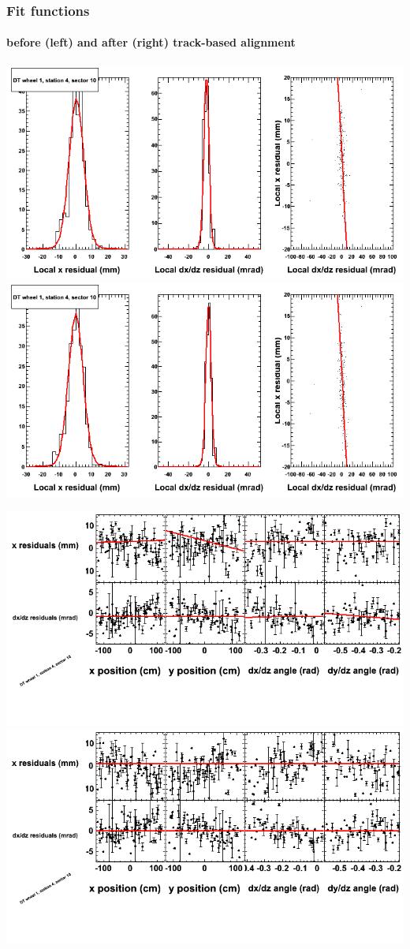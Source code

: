 \documentclass[compress]{beamer}
\begin{document}
\begin{frame}
\frametitle{Fit functions}
\framesubtitle{before (left) and after (right) track-based alignment}
\includegraphics[width=0.5\linewidth]{fitfunctions_re01/MBwhDst4sec10_bellcurves.png} \includegraphics[width=0.5\linewidth]{fitfunctions_re05/MBwhDst4sec10_bellcurves.png}

\includegraphics[width=0.5\linewidth]{fitfunctions_re01/MBwhDst4sec10_polynomials.png} \includegraphics[width=0.5\linewidth]{fitfunctions_re05/MBwhDst4sec10_polynomials.png}
\end{frame}
\end{document}
